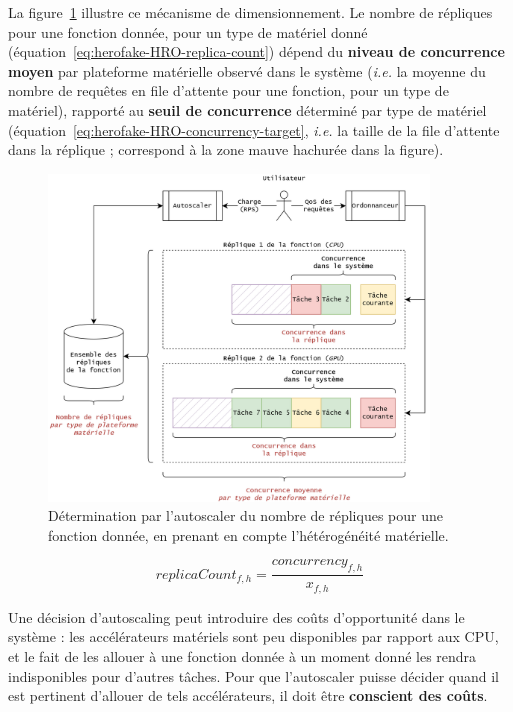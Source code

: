 La figure~\ref{figure:herofake-orchestration-scaling} illustre ce mécanisme de dimensionnement. Le nombre de répliques pour une fonction donnée, pour un type de matériel donné (équation~\ref{eq:herofake-HRO-replica-count}) dépend du \textbf{niveau de concurrence moyen} par plateforme matérielle observé dans le système (\textit{i.e.} la moyenne du nombre de requêtes en file d'attente pour une fonction, pour un type de matériel), rapporté au \textbf{seuil de concurrence} déterminé par type de matériel (équation~\ref{eq:herofake-HRO-concurrency-target}, \textit{i.e.} la taille de la file d'attente dans la réplique ; correspond à la zone mauve hachurée dans la figure).

\begin{figure}[!ht]
    \centering
    \includegraphics[width=0.9\textwidth]{4_Chapitre4/figures/orchestration-scaling.png}
    \caption{Détermination par l'autoscaler du nombre de répliques pour une fonction donnée, en prenant en compte l'hétérogénéité matérielle.}
    \label{figure:herofake-orchestration-scaling}
\end{figure}

\begin{equation}
    replicaCount_{f, h} = \frac{concurrency_{f, h}}{x_{f, h}}
\label{eq:herofake-HRO-replica-count}
\end{equation}

Une décision d'autoscaling peut introduire des coûts d'opportunité dans le système : les accélérateurs matériels sont peu disponibles par rapport aux \gls{CPU}, et le fait de les allouer à une fonction donnée à un moment donné les rendra indisponibles pour d'autres tâches. Pour que l'autoscaler puisse décider quand il est pertinent d'allouer de tels accélérateurs, il doit être \textbf{conscient des coûts}.

